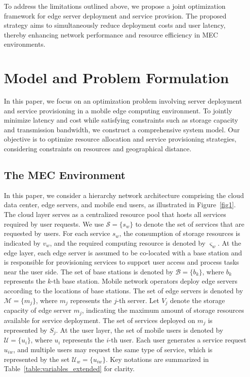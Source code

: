 \documentclass[10pt, conference, letterpaper]{IEEEtran}
\begin{document}
To address the limitations outlined above, we propose a joint optimization framework for edge server deployment and service provision. The proposed strategy aims to simultaneously reduce deployment costs and user latency, thereby enhancing network performance and resource efficiency in MEC environments.

\section{Model and Problem Formulation}
In this paper, we focus on an optimization problem involving server deployment and service provisioning in a mobile edge computing environment. To jointly minimize latency and cost while satisfying constraints such as storage capacity and transmission bandwidth, we construct a comprehensive system model. Our objective is to optimize resource allocation and service provisioning strategies, considering constraints on resources and geographical distance. 
\subsection{The MEC Environment}
In this paper, we consider a hierarchy network architecture comprising the cloud data center, edge servers, and mobile end users, as illustrated in Figure~\ref{fig1}. The cloud layer serves as a centralized resource pool that hosts all services required by user requests. We use $\mathcal{S} = \{s_w\}$ to denote the set of services that are requested by users. For each service $s_w$, the consumption of storage resources is indicated by $v_{w}$, and the required computing resource is denoted by $\varsigma_{w}$. At the edge layer, each edge server is assumed to be co-located with a base station and is responsible for provisioning services to support user access and process tasks near the user side. The set of base stations is denoted by $\mathcal{B} = \{b_k\}$, where $b_k$ represents the $k$-th base station. Mobile network operators deploy edge servers according to the locations of base stations. The set of edge servers is denoted by $\mathcal{M} = \{m_j\}$, where $m_j$ represents the $j$-th server. Let $V_j$ denote the storage capacity of edge server $m_j$, indicating the maximum amount of storage resources available for service deployment. The set of services deployed on $m_j$ is represented by $S_j$. At the user layer, the set of mobile users is denoted by $\mathcal{U} = \{u_i\}$, where $u_i$ represents the $i$-th user. Each user generates a service request $u_{iw}$, and multiple users may request the same type of service, which is represented by the set $\mathcal{U}_{w}=\{u_{iw}\}$. Key notations are summarized in Table~\ref{table:variables_extended} for clarity. 
\end{document}
